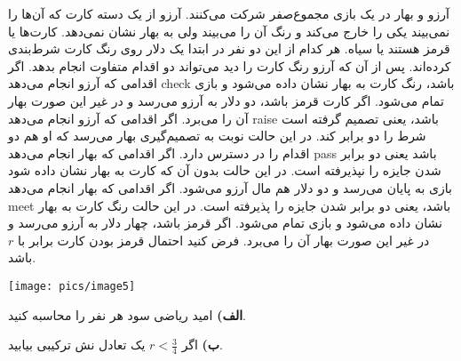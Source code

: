 آرزو و بهار در یک بازی مجموع‌صفر شرکت می‌کنند. آرزو از یک دسته کارت که آن‌ها را نمی‌بیند یکی را خارج می‌کند و رنگ آن را می‌بیند ولی به بهار نشان نمی‌دهد. کارت‌ها یا قرمز هستند یا سیاه. هر کدام از این دو نفر در ابتدا یک دلار روی رنگ کارت شرط‌بندی کرده‌اند. پس از آن که آرزو رنگ کارت را دید می‌تواند دو اقدام متفاوت انجام بدهد.
اگر اقدامی که آرزو انجام می‌دهد check باشد، رنگ کارت به بهار نشان داده می‌شود و بازی تمام می‌شود. اگر کارت قرمز باشد، دو دلار به آرزو می‌رسد و در غیر این صورت بهار آن را می‌برد. اگر اقدامی که آرزو انجام می‌دهد raise باشد، یعنی تصمیم گرفته است شرط را دو برابر کند. در این حالت نوبت به تصمیم‌گیری بهار می‌رسد که او هم دو اقدام را در دسترس دارد.
اگر اقدامی که بهار انجام می‌دهد pass باشد یعنی دو برابر شدن جایزه را نپذیرفته است. در این حالت بدون آن که کارت به بهار نشان داده شود بازی به پایان می‌رسد و دو دلار هم مال آرزو می‌شود. اگر اقدامی که بهار انجام می‌دهد meet باشد، یعنی دو برابر شدن جایزه را پذیرفته است. در این حالت رنگ کارت به بهار نشان داده می‌شود و بازی تمام می‌شود. اگر قرمز باشد، چهار دلار به آرزو می‌رسد و در غیر این صورت بهار آن را می‌برد.
فرض کنید احتمال قرمز بودن کارت برابر با
$r$
باشد.
\begin{center}
    \texttt{[image: pics/image5]}
\end{center}
\textbf{الف)}
امید ریاضی سود هر نفر را محاسبه کنید.
\vspace{5pt}

\textbf{ب)}
اگر
$r < \frac{3}{4}$
یک تعادل نش ترکیبی بیابید.